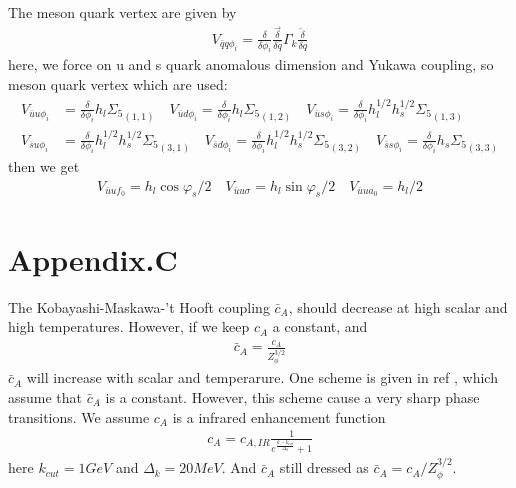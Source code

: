 \documentclass[12pt]{article}
\begin{document}
The meson quark vertex are given by
\begin{align}
V_{\bar q q \phi_i}=\frac{\delta}{\delta \phi_i}\frac{\overrightarrow{\delta}}{\delta \bar q}\Gamma_k \frac{\overleftarrow{\delta}}{\delta q}
\end{align}
here, we force on u and s quark anomalous dimension and Yukawa coupling, so meson quark vertex which are used:
\begin{align}
V_{\bar u u \phi_i}&=\frac{\delta}{\delta \phi_i}h_l {\Sigma_5}_{(1,1)}  \quad  V_{\bar u d \phi_i}=\frac{\delta}{\delta \phi_i}h_l {\Sigma_5}_{(1,2)} \quad V_{\bar u s \phi_i}=\frac{\delta}{\delta \phi_i}h_l^{1/2}h_s^{1/2}{\Sigma_5}_{(1,3)}\\
V_{\bar s u \phi_i}&=\frac{\delta}{\delta \phi_i}h_l^{1/2}h_s^{1/2} {\Sigma_5}_{(3,1)} \quad  V_{\bar s d \phi_i}=\frac{\delta}{\delta \phi_i}h_l^{1/2}h_s^{1/2} {\Sigma_5}_{(3,2)} \quad  V_{\bar s s \phi_i}=\frac{\delta}{\delta \phi_i}h_s {\Sigma_5}_{(3,3)}
\end{align}
then we get
\begin{align}
V_{\bar u u f_0}=h_l \cos\varphi_s /2 \quad V_{\bar u u \sigma}=h_l \sin\varphi_s /2 \quad V_{\bar u u a_0}=h_l /2%
\end{align}

\section{Appendix.C}
The Kobayashi-Maskawa-’t Hooft coupling $\bar c_A$, should decrease
at high scalar and high temperatures. However, if we keep $c_A$ a constant,
and 
\begin{align}
\bar c_A=\frac{c_A}{Z_\phi^{3/2}}
\end{align}
$\bar c_A$ will increase with scalar and temperarure. One scheme is given in ref \cite{Rennecke:2016tkm}, which assume that $\bar c_A$ is a constant. However, this scheme cause a very sharp phase transitions. We assume  $c_A$ is a infrared enhancement function
\begin{align}
c_A=c_{A,IR}\frac{1}{e^{\frac{k-k_{cut}}{\Delta_k}}+1}
\end{align}
here $k_{cut}=1 GeV$ and $\Delta_k=20 MeV$. And $\bar c_A$ still dressed as $\bar c_A=c_A/Z_\phi^{3/2}$.
\end{document}
